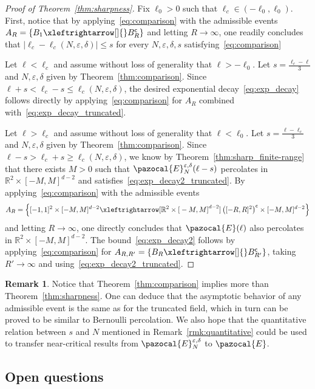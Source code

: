 \documentclass[10pt]{amsart}
\theoremstyle{definition}\newtheorem{defi}[theo]{Definition}\newtheorem{rema}[theo]{Remark}\newtheorem{exam}[theo]{Example}\newtheorem{exem}[theo]{Example}\newtheorem{nota}[theo]{Notation}
\newcommand{\R}{\mathbb{R}}
\newcommand{\sfc}{\mathsf{c}}
\newcommand{\lr}[4]{#3\xleftrightarrow[#1]{#2} #4}
\begin{document}
\begin{proof}[Proof of Theorem~\ref{thm:sharpness}]
Fix $\ell_0>0$ such that $\ell_c\in(-\ell_0,\ell_0)$. First, notice that by applying~\eqref{eq:comparison} with the admissible events $A_R=\{\lr{}{}{B_1}{B_R^{\sfc}}\}$ and letting $R\to\infty$, one readily concludes that $|\ell_c-\ell_c(N,\varepsilon,\delta)|\leq s$ for every $N,\varepsilon,\delta, s$ satisfying~\eqref{eq:comparison}

Let $\ell<\ell_c$ and assume without loss of generality that $\ell>-\ell_0$. Let $s=\frac{\ell_c-\ell}{3}$ and $N,\varepsilon,\delta$ given by Theorem~\ref{thm:comparison}. Since $\ell+s<\ell_c-s\leq \ell_c(N,\varepsilon,\delta)$, the desired exponential decay~\eqref{eq:exp_decay} follows directly by applying~\eqref{eq:comparison} for $A_R$ combined with~\eqref{eq:exp_decay_truncated}.

Let $\ell>\ell_c$ and assume without loss of generality that $\ell<\ell_0$. Let $s=\frac{\ell-\ell_c}{3}$ and $N,\varepsilon,\delta$ given by Theorem~\ref{thm:comparison}. Since $\ell-s>\ell_c+s\geq \ell_c(N,\varepsilon,\delta)$, we know by Theorem~\ref{thm:sharp_finite-range} that there exists $M>0$ such that $\pazocal{E}_N^{\varepsilon,\delta}(\ell-s)$ percolates in $\R^2\times[-M,M]^{d-2}$ and satisfies~\eqref{eq:exp_decay2_truncated}. By applying~\eqref{eq:comparison} with the admissible events 
\[
{A_R=\left\{\lr{\R^2\times{[}-M,M{]}^{d-2}}{}{[-1,1]^2\times[-M,M]^{d-2}}{\left([-R,R]^2\right)^{\sfc}\times[-M,M]^{d-2}}\right\}}
\]
and letting $R\to\infty$, one directly concludes that $\pazocal{E}(\ell)$ also percolates in $\R^2\times[-M,M]^{d-2}$. The bound~\eqref{eq:exp_decay2} follows by applying~\eqref{eq:comparison} for $A_{R,R'}=\{\lr{}{}{B_R}{B_{R'}^{\sfc}}\}$, taking $R'\to\infty$ and using~\eqref{eq:exp_decay2_truncated}.
\end{proof}

\begin{rema}\label{rmk:supercritical}
Notice that Theorem~\ref{thm:comparison} implies more than Theorem~\ref{thm:sharpness}. One can deduce that the asymptotic behavior of any admissible event is the same as for the truncated field, which in turn can be proved to be similar to Bernoulli percolation. We also hope that the quantitative relation between $s$ and $N$ mentioned in Remark~\ref{rmk:quantitative} could be used to transfer near-critical results from $\pazocal{E}^{\varepsilon,\delta}_N$ to $\pazocal{E}$.
\end{rema}


\subsection{Open questions}
\end{document}
